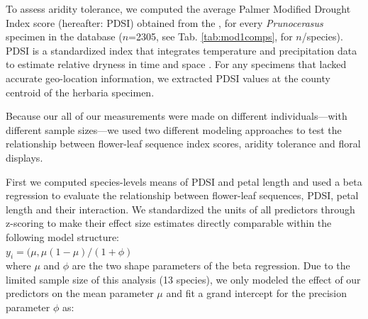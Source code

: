 \documentclass{article}[12pt]
\begin{document}
To assess aridity tolerance, we computed the average Palmer Modified Drought Index score (hereafter: PDSI) obtained from the \citet{NOAA}, for every \textit{Prunocerasus} specimen in the database ($n$=2305, see Tab. \ref{tab:mod1comps}, for $n$/species). PDSI is a standardized index that integrates temperature and precipitation data to estimate relative dryness in time and space \citep{Heim:2002uw}. For any specimens that lacked accurate geo-location information, we extracted PDSI values at the county centroid of the herbaria specimen. 

Because our all of our measurements were made on different individuals---with different sample sizes---we used two different modeling approaches to test the relationship between flower-leaf sequence index scores, aridity tolerance and floral displays.

First we computed species-levels means of PDSI and petal length and used a beta regression to evaluate the relationship between flower-leaf sequences, PDSI, petal length and their interaction. We standardized the units of all predictors through z-scoring \citep{Gelman2007} to make their effect size estimates directly comparable within the following model structure:\\

$y_i = (\mu,\mu(1-\mu)/(1+\phi)$\\

where $\mu$ and $\phi$ are the two shape parameters of the beta regression. Due to the limited sample size of this analysis (13 species), we only modeled the effect of our predictors on the mean parameter $\mu$ and fit a grand intercept for the precision parameter $\phi$ as:\\
\end{document}
